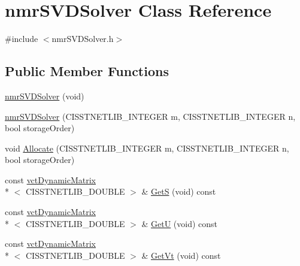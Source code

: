 \hypertarget{classnmr_s_v_d_solver}{\section{nmr\-S\-V\-D\-Solver Class Reference}
\label{classnmr_s_v_d_solver}
}


{\ttfamily \#include $<$nmr\-S\-V\-D\-Solver.\-h$>$}

\subsection*{Public Member Functions}
\begin{DoxyCompactItemize}
\item 
\hyperlink{classnmr_s_v_d_solver_a0c735069bd7aad7dc6bd1fcf422fbcde}{nmr\-S\-V\-D\-Solver} (void)
\item 
\hyperlink{classnmr_s_v_d_solver_a5ab036be000c8d440bb0ee0943b2990d}{nmr\-S\-V\-D\-Solver} (C\-I\-S\-S\-T\-N\-E\-T\-L\-I\-B\-\_\-\-I\-N\-T\-E\-G\-E\-R m, C\-I\-S\-S\-T\-N\-E\-T\-L\-I\-B\-\_\-\-I\-N\-T\-E\-G\-E\-R n, bool storage\-Order)
\item 
void \hyperlink{classnmr_s_v_d_solver_af32d34f0fc16618b2b0658b198d2dd85}{Allocate} (C\-I\-S\-S\-T\-N\-E\-T\-L\-I\-B\-\_\-\-I\-N\-T\-E\-G\-E\-R m, C\-I\-S\-S\-T\-N\-E\-T\-L\-I\-B\-\_\-\-I\-N\-T\-E\-G\-E\-R n, bool storage\-Order)
\item 
const \hyperlink{classvct_dynamic_matrix}{vct\-Dynamic\-Matrix}\\*
$<$ C\-I\-S\-S\-T\-N\-E\-T\-L\-I\-B\-\_\-\-D\-O\-U\-B\-L\-E $>$ \& \hyperlink{classnmr_s_v_d_solver_aef9dd9baa625aadc95244c5b8c5757c6}{Get\-S} (void) const 
\item 
const \hyperlink{classvct_dynamic_matrix}{vct\-Dynamic\-Matrix}\\*
$<$ C\-I\-S\-S\-T\-N\-E\-T\-L\-I\-B\-\_\-\-D\-O\-U\-B\-L\-E $>$ \& \hyperlink{classnmr_s_v_d_solver_a06ca9479cd377c3edee5286aa46634e9}{Get\-U} (void) const 
\item 
const \hyperlink{classvct_dynamic_matrix}{vct\-Dynamic\-Matrix}\\*
$<$ C\-I\-S\-S\-T\-N\-E\-T\-L\-I\-B\-\_\-\-D\-O\-U\-B\-L\-E $>$ \& \hyperlink{classnmr_s_v_d_solver_a919c907c6377331cf1a1a8d1a5085940}{Get\-Vt} (void) const 
\end{DoxyCompactItemize}
